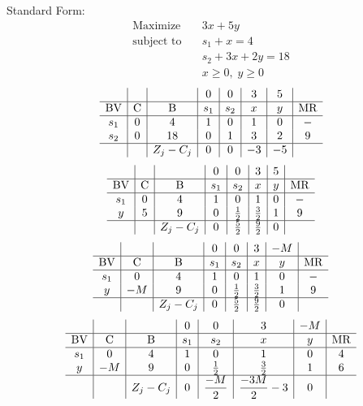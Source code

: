 \documentclass{article}
\begin{document}
Standard Form:\\
\begin{align*}
\text{Maximize} \quad & 3x + 5y\\
\text{subject to} \quad
& s_{1} + x=4\\
& s_{2} + 3x + 2y=18\\
& x\ge0,\; y\ge0\end{align*}
\begin{align*}
\begin{array}{c|c|c|c|c|c|c|c}
 &  &  & 0 & 0 & 3 & 5 & \\
\hline
\text{BV} & \text{C} & \text{B} & s_{1} & s_{2} & x & y & \text{MR} \\
\hline
s_{1} & 0 & 4 & 1 & 0 & 1 & 0 & - \\
s_{2} & 0 & 18 & 0 & 1 & 3 & 2 & 9 \\
\hline
 &  & Z_j-C_j & 0 & 0 & -3 & -5 & \\
\end{array}
\end{align*}
\begin{align*}
\begin{array}{c|c|c|c|c|c|c|c}
 &  &  & 0 & 0 & 3 & 5 & \\
\hline
\text{BV} & \text{C} & \text{B} & s_{1} & s_{2} & x & y & \text{MR} \\
\hline
s_{1} & 0 & 4 & 1 & 0 & 1 & 0 & - \\
y & 5 & 9 & 0 & \frac{1}{2} & \frac{3}{2} & 1 & 9 \\
\hline
 &  & Z_j-C_j & 0 & \frac{5}{2} & \frac{9}{2} & 0 & \\
\end{array}
\end{align*}
\begin{align*}
\begin{array}{c|c|c|c|c|c|c|c}
 &  &  & 0 & 0 & 3 & -M & \\
\hline
\text{BV} & \text{C} & \text{B} & s_{1} & s_{2} & x & y & \text{MR} \\
\hline
s_{1} & 0 & 4 & 1 & 0 & 1 & 0 & - \\
y & -M & 9 & 0 & \frac{1}{2} & \frac{3}{2} & 1 & 9 \\
\hline
 &  & Z_j-C_j & 0 & \frac{5}{2} & \frac{9}{2} & 0 & \\
\end{array}
\end{align*}
\begin{align*}
\begin{array}{c|c|c|c|c|c|c|c}
 &  &  & 0 & 0 & 3 & -M & \\
\hline
\text{BV} & \text{C} & \text{B} & s_{1} & s_{2} & x & y & \text{MR} \\
\hline
s_{1} & 0 & 4 & 1 & 0 & 1 & 0 & 4 \\
y & -M & 9 & 0 & \frac{1}{2} & \frac{3}{2} & 1 & 6 \\
\hline
 &  & Z_j-C_j & 0 & \dfrac{-M}{2} & \dfrac{-3M}{2} - 3 & 0 & \\
\end{array}
\end{align*}
\end{document}
